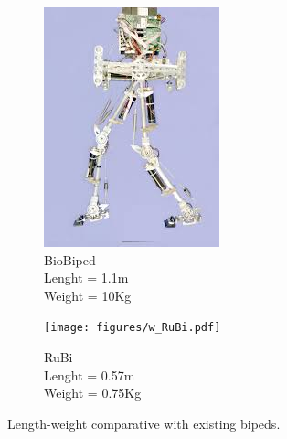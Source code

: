 \begin{figure}[htb]
\begin{subfigure}{.22\textwidth}
    \includegraphics[width=\linewidth]{figures/w_biobiped.jpg}
    \caption{BioBiped\\
    Lenght = 1.1m\\
    Weight = 10Kg}
    \label{fig:w_biobiped}
  \end{subfigure}
  \begin{subfigure}{.22\textwidth}
    \texttt{[image: figures/w\_RuBi.pdf]}
    \caption{RuBi\\
    Lenght = 0.57m\\
    Weight = 0.75Kg}
    \label{fig:w_rubi}
  \end{subfigure}
  \caption{Length-weight comparative with existing bipeds.}
  \label{fig:bipedal_robots}
\end{figure}  


